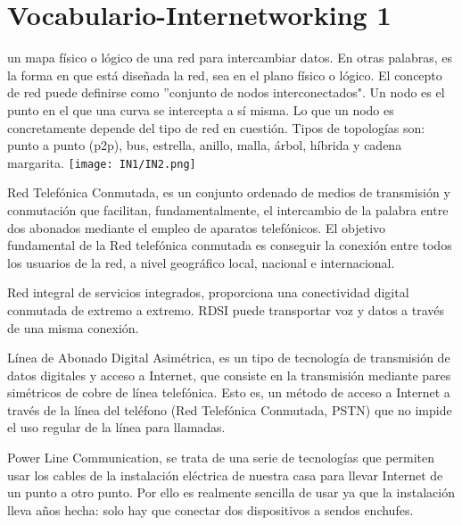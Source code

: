 \documentclass[
	11pt, %
	fleqn, %
	a4paper, %
]{LegrandOrangeBook}
\begin{document}
\section*{Vocabulario-Internetworking 1}
\begin{vocabulary}
un mapa físico o lógico de una red para intercambiar datos. En otras palabras, es la forma en que está diseñada la red, sea en el plano físico o lógico. El concepto de red puede definirse como ''conjunto de nodos interconectados". Un nodo es el punto en el que una curva se intercepta a sí misma. Lo que un nodo es concretamente depende del tipo de red en cuestión. Tipos de topologías son: punto a punto (p2p), bus, estrella, anillo, malla, árbol, híbrida y cadena margarita.
\texttt{[image: IN1/IN2.png]}
\end{vocabulary}
\begin{vocabulary}[RTC]
Red Telefónica Conmutada, es un conjunto ordenado de medios de transmisión y conmutación que facilitan, fundamentalmente, el intercambio de la palabra entre dos abonados mediante el empleo de aparatos telefónicos. El objetivo fundamental de la Red telefónica conmutada es conseguir la conexión entre todos los usuarios de la red, a nivel geográfico local, nacional e internacional.
\end{vocabulary}
\begin{vocabulary}[RDSI]
Red integral de servicios integrados, proporciona una conectividad digital conmutada de extremo a extremo. RDSI puede transportar voz y datos a través de una misma conexión.
\end{vocabulary}
\begin{vocabulary}[ADSL]
Línea de Abonado Digital Asimétrica, es un tipo de tecnología de transmisión de datos digitales y acceso a Internet, que consiste en la transmisión mediante pares simétricos de cobre de línea telefónica. Esto es, un método de acceso a Internet a través de la línea del teléfono (Red Telefónica Conmutada, PSTN) que no impide el uso regular de la línea para llamadas.
\end{vocabulary}
\begin{vocabulary}[PLC]
Power Line Communication, se trata de una serie de tecnologías que permiten usar los cables de la instalación eléctrica de nuestra casa para llevar Internet de un punto a otro punto. Por ello es realmente sencilla de usar ya que la instalación lleva años hecha: solo hay que conectar dos dispositivos a sendos enchufes.
\end{vocabulary}
\end{document}
